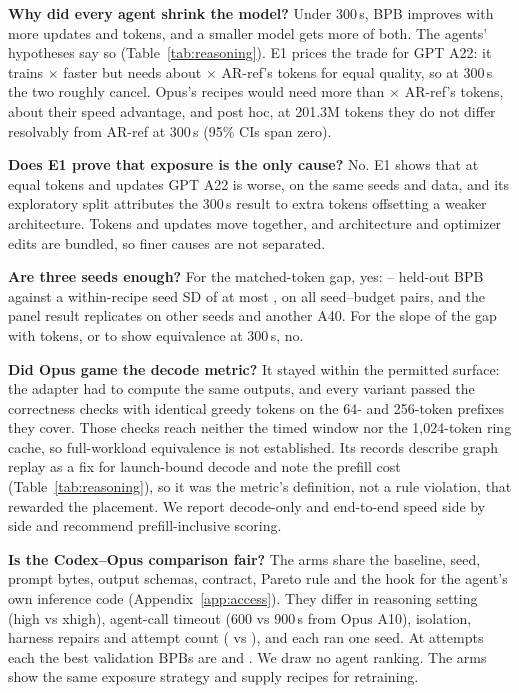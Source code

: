 \documentclass{article}
\begin{document}
\textbf{Why did every agent shrink the model?} Under 300\,s, BPB improves with more updates and tokens, and a smaller model gets more of both. The agents' hypotheses say so (Table~\ref{tab:reasoning}). E1 prices the trade for GPT A22: it trains \CREOneRho$\times$ faster but needs about \CREOneK$\times$ AR-ref's tokens for equal quality, so at 300\,s the two roughly cancel. Opus's recipes would need more than \CRMTKBound$\times$ AR-ref's tokens, about their speed advantage, and post hoc, at 201.3M tokens they do not differ resolvably from AR-ref at 300\,s (95\% CIs span zero).

\textbf{Does E1 prove that exposure is the only cause?} No. E1 shows that at equal tokens and updates GPT A22 is worse, on the same seeds and data, and its exploratory split attributes the 300\,s result to extra tokens offsetting a weaker architecture. Tokens and updates move together, and architecture and optimizer edits are bundled, so finer causes are not separated.

\textbf{Are three seeds enough?} For the matched-token gap, yes: \CREOneMatchedLoAbs--\CREOneMatchedHiAbs{} held-out BPB against a within-recipe seed SD of at most \CREOneMaxSD, on all \CREOnePairs{} seed--budget pairs, and the panel result replicates on other seeds and another A40. For the slope of the gap with tokens, or to show equivalence at 300\,s, no.

\textbf{Did Opus game the decode metric?} It stayed within the permitted surface: the adapter had to compute the same outputs, and every variant passed the correctness checks with identical greedy tokens on the 64- and 256-token prefixes they cover. Those checks reach neither the timed window nor the 1{,}024-token ring cache, so full-workload equivalence is not established. Its records describe graph replay as a fix for launch-bound decode and note the prefill cost (Table~\ref{tab:reasoning}), so it was the metric's definition, not a rule violation, that rewarded the placement. We report decode-only and end-to-end speed side by side and recommend prefill-inclusive scoring.

\textbf{Is the Codex--Opus comparison fair?} The arms share the baseline, seed, prompt bytes, output schemas, contract, Pareto rule and the hook for the agent's own inference code (Appendix~\ref{app:access}). They differ in reasoning setting (high vs xhigh), agent-call timeout (600 vs 900\,s from Opus A10), isolation, harness repairs and attempt count (\CRCxAttempts{} vs \CROpAttempts), and each ran one seed. At \CRCxAttempts{} attempts each the best validation BPBs are \CRCxBestBPB{} and \CROpBestTwentyTwo. We draw no agent ranking. The arms show the same exposure strategy and supply recipes for retraining.
\end{document}
